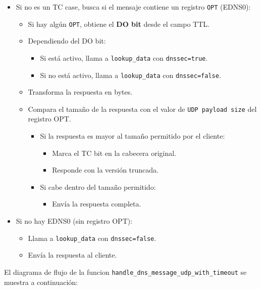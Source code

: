 \begin{itemize}
    \item Si no es un TC case, busca si el mensaje contiene un registro \texttt{OPT} (EDNS0):
    \begin{itemize}
        \item Si hay algún \texttt{OPT}, obtiene el \textbf{DO bit} desde el campo TTL.
        \item Dependiendo del DO bit:
        \begin{itemize}
            \item Si está activo, llama a \texttt{lookup\_data} con \texttt{dnssec=true}.
            \item Si no está activo, llama a \texttt{lookup\_data} con \texttt{dnssec=false}.
        \end{itemize}
        \item Transforma la respuesta en bytes.
        \item Compara el tamaño de la respuesta con el valor de \texttt{UDP payload size} del registro OPT.
        \begin{itemize}
            \item Si la respuesta es mayor al tamaño permitido por el cliente:
            \begin{itemize}
                \item Marca el TC bit en la cabecera original.
                \item Responde con la versión truncada.
            \end{itemize}
            \item Si cabe dentro del tamaño permitido:
            \begin{itemize}
                \item Envía la respuesta completa.
            \end{itemize}
        \end{itemize}
    \end{itemize}

    \item Si no hay EDNS0 (sin registro OPT):
    \begin{itemize}
        \item Llama a \texttt{lookup\_data} con \texttt{dnssec=false}.
        \item Envía la respuesta al cliente.
    \end{itemize}
\end{itemize}


El diagrama de flujo de la funcion \texttt{handle\_dns\_message\_udp\_with\_timeout} se muestra a continuación:

